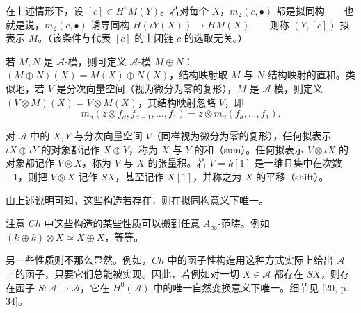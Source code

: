 \begin{definition*}
在上述情形下，设 $[c]\in H^0M(Y)$。若对每个 $X$，$m_2(c,\bullet)$ 都是拟同构——也就是说，$m_2(c,\bullet)$ 诱导同构 $H(\iota Y(X))\to HM(X)$——则称 $(Y,[c])$ 拟表示 $M$。（该条件与代表 $[c]$ 的上闭链 $c$ 的选取无关。）
\end{definition*}


若 $M,N$ 是 $\mathcal{A}$-模，则可定义 $\mathcal{A}$-模 $M\oplus N$：$(M\oplus N)(X)=M(X)\oplus N(X)$，结构映射取 $M$ 与 $N$ 结构映射的直和。类似地，若 $V$ 是分次向量空间（视为微分为零的复形），$M$ 是 $\mathcal{A}$-模，则定义 $(V\otimes M)(X)=V\otimes M(X)$，其结构映射忽略 $V$，即
\[
m_d(z\otimes f_d,f_{d-1},\dots,f_1)=z\otimes m_d(f_d,\dots,f_1).
\]

对 $\mathcal{A}$ 中的 $X,Y$ 与分次向量空间 $V$（同样视为微分为零的复形），任何拟表示 $\iota X\oplus\iota Y$ 的对象都记作 $X\oplus Y$，称为 $X$ 与 $Y$ 的和（sum）。任何拟表示 $V\otimes\iota X$ 的对象都记作 $V\otimes X$，称为 $V$ 与 $X$ 的张量积。若 $V=k[1]$ 是一维且集中在次数 $-1$，则把 $V\otimes X$ 记作 $SX$，甚至记作 $X[1]$，并称之为 $X$ 的平移（shift）。

由上述说明可知，这些构造若存在，则在拟同构意义下唯一。

注意 $Ch$ 中这些构造的某些性质可以搬到任意 $A_\infty$-范畴。例如 $(k\oplus k)\otimes X\simeq X\oplus X$，等等。


另一些性质则不那么显然。例如，$Ch$ 中的函子性构造用这种方式实际上给出 $\mathcal{A}$ 上的函子，只要它们总能被实现。因此，若例如对一切 $X\in\mathcal{A}$ 都存在 $SX$，则存在函子 $S\colon\mathcal{A}\to\mathcal{A}$，它在 $H^0(\mathcal{A})$ 中的唯一自然变换意义下唯一。细节见 [20, p. 34]。

